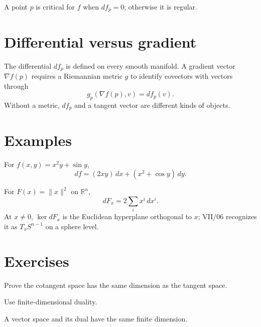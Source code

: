 \begin{definition}\label{def:vii05-critical}
A point \(p\) is critical for \(f\) when \(df_p=0\); otherwise it is regular.
\end{definition}

\section{Differential versus gradient}
\begin{warning}\label{warning:vii05-gradient}
The differential \(df_p\) is defined on every smooth manifold. A gradient vector \(\nabla f(p)\) requires a Riemannian metric \(g\) to identify covectors with vectors through
\[
g_p(\nabla f(p),v)=df_p(v).
\]
Without a metric, \(df_p\) and a tangent vector are different kinds of objects.
\end{warning}

\section{Examples}
\begin{example}\label{ex:vii05-euclidean}
For \(f(x,y)=x^2y+\sin y\),
\[
df=(2xy)\,dx+(x^2+\cos y)\,dy.
\]
\end{example}

\begin{example}\label{ex:vii05-sphere-constraint}
For \(F(x)=\|x\|^2\) on \(\mathbb R^n\),
\[
dF_x=2\sum_i x^i\,dx^i.
\]
At \(x\neq0\), \(\ker dF_x\) is the Euclidean hyperplane orthogonal to \(x\); VII/06 recognizes it as \(T_xS^{n-1}\) on a sphere level.
\end{example}

\section{Exercises}
\begin{exercise}\label{exr:vii05-01}
Prove the cotangent space has the same dimension as the tangent space.
\end{exercise}
\begin{hint}
Use finite-dimensional duality.
\end{hint}
\begin{solution}
A vector space and its dual have the same finite dimension.
\end{solution}


